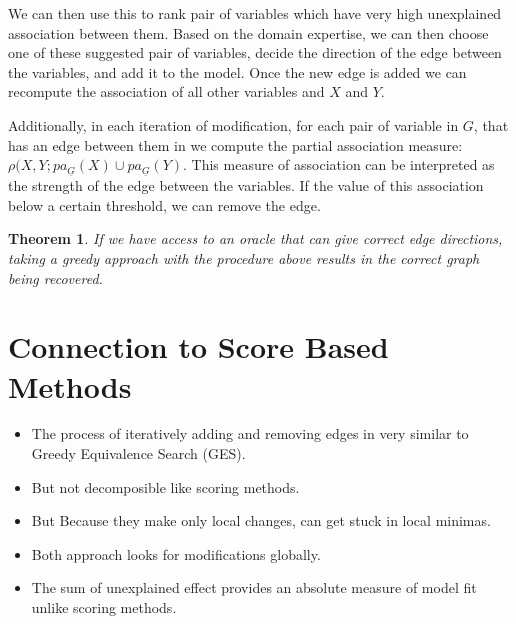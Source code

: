 \documentclass{uai2025} %
\newtheorem{theorem}{Theorem}
\begin{document}
We can then use this to rank pair of variables which have very high unexplained
association between them. Based on the domain expertise, we can then choose one
of these suggested pair of variables, decide the direction of the edge between
the variables, and add it to the model. Once the new edge is added we can
recompute the association of all other variables and $ X $ and $ Y $.

Additionally, in each iteration of modification, for each pair of variable in $
G $, that has an edge between them in we compute the partial association
measure: $ \rho(X, Y; pa_{\underline{G}}(X) \cup pa_{\underline{G}}(Y) $. This
measure of association can be interpreted as the strength of the edge between
the variables. If the value of this association below a certain threshold, we
can remove the edge.


\begin{theorem}
	If we have access to an oracle that can give correct edge directions, taking a
	greedy approach with the procedure above results in the correct graph
	being recovered. 
\end{theorem}

\section{Connection to Score Based Methods}
\begin{itemize}
	\item The process of iteratively adding and removing edges in very similar to
		Greedy Equivalence Search (GES).
	\item But not decomposible like scoring methods. 
	\item But Because they make only local changes, can get stuck in local minimas.
	\item Both approach looks for modifications globally.
	\item The sum of unexplained effect provides an absolute measure of model fit 
		unlike scoring methods.
\end{itemize}
\end{document}
